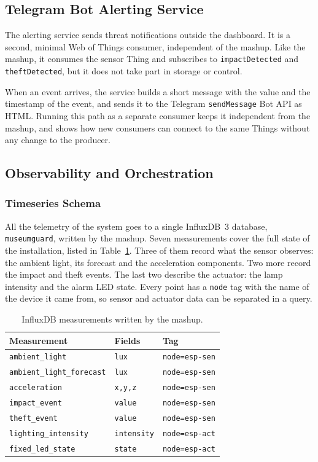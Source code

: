 \documentclass[conference]{IEEEtran}
\begin{document}
\subsection{Telegram Bot Alerting Service}
The alerting service sends threat notifications outside the dashboard. It is a second, minimal Web of Things consumer, independent of the mashup. Like the mashup, it consumes the sensor Thing and subscribes to \texttt{impactDetected} and \texttt{theftDetected}, but it does not take part in storage or control.

When an event arrives, the service builds a short message with the value and the timestamp of the event, and sends it to the Telegram \texttt{sendMessage} Bot API as HTML. Running this path as a separate consumer keeps it independent from the mashup, and shows how new consumers can connect to the same Things without any change to the producer.

\subsection{Observability and Orchestration}

\subsubsection{Timeseries Schema}
All the telemetry of the system goes to a single InfluxDB~3 database, \texttt{museumguard}, written by the mashup. Seven measurements cover the full state of the installation, listed in Table~\ref{tab:influx}. Three of them record what the sensor observes: the ambient light, its forecast and the acceleration components. Two more record the impact and theft events. The last two describe the actuator: the lamp intensity and the alarm LED state. Every point has a \texttt{node} tag with the name of the device it came from, so sensor and actuator data can be separated in a query.

\begin{table}[htbp]
\caption{InfluxDB measurements written by the mashup.}
\label{tab:influx}
\centering
\footnotesize
\begin{tabular}{@{}lll@{}}
\toprule
\textbf{Measurement} & \textbf{Fields} & \textbf{Tag} \\
\midrule
\texttt{ambient\_light} & \texttt{lux} & \texttt{node=esp-sen} \\
\texttt{ambient\_light\_forecast} & \texttt{lux} & \texttt{node=esp-sen} \\
\texttt{acceleration} & \texttt{x,y,z} & \texttt{node=esp-sen} \\
\texttt{impact\_event} & \texttt{value} & \texttt{node=esp-sen} \\
\texttt{theft\_event} & \texttt{value} & \texttt{node=esp-sen} \\
\texttt{lighting\_intensity} & \texttt{intensity} & \texttt{node=esp-act} \\
\texttt{fixed\_led\_state} & \texttt{state} & \texttt{node=esp-act} \\
\bottomrule
\end{tabular}
\end{table}
\end{document}
